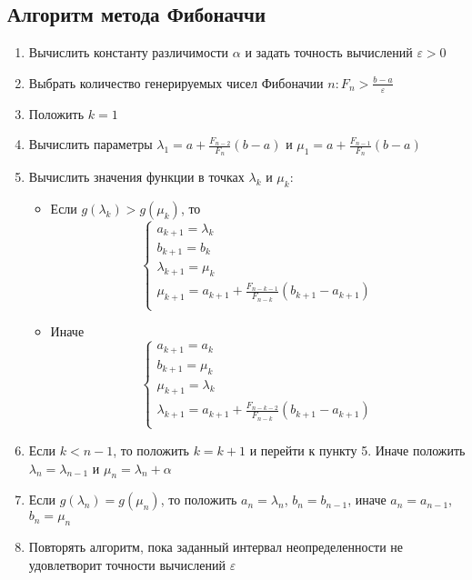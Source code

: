 \documentclass[../body.tex]{subfiles}
\begin{document}
\subsection{Алгоритм метода Фибоначчи}
\begin{enumerate}
	\item Вычислить константу различимости $\alpha$ и задать точность вычислений $\varepsilon>0$
	\item Выбрать количество генерируемых чисел Фибоначии $n:F_n >\frac{b-a}{\varepsilon}$
	\item Положить $k=1$
	\item Вычислить параметры $\lambda_1=a+\frac{F_{n-2}}{F_n}(b-a)$ и $\mu_1=a+\frac{F_{n-1}}{F_n}(b-a)$
	\item Вычислить значения функции в точках $\lambda_k$ и $\mu_k:$
	    \begin{itemize}
	        \item Если $g(\lambda_k)>g(\mu_k)$, то
	            \begin{equation}
	                \left\{
	                \begin{array}{ll}
	                    a_{k+1}=\lambda_k\\
	                    b_{k+1}=b_k\\
	                    \lambda_{k+1}=\mu_k\\
	                    \mu_{k+1} = a_{k+1}+\frac{F_{n-k-1}}{F_{n-k}}(b_{k+1}-a_{k+1})\\
	                \end{array}
	                \right.
	           \end{equation}
	       \item Иначе
	            \begin{equation}
	               \left\{
	               \begin{array}{ll}
	                   a_{k+1}=a_k\\
	                   b_{k+1}=\mu_k\\
	                   \mu_{k+1}=\lambda_k\\ \lambda_{k+1}=a_{k+1}+\frac{F_{n-k-2}}{F_{n-k}}(b_{k+1}-a_{k+1})\\
	               \end{array}
	               \right.
	           \end{equation}
        \end{itemize}
	\item Если $k<n-1$, то положить $k=k+1$ и перейти к пункту 5. Иначе положить $\lambda_{n}=\lambda_{n-1}$ и $\mu_{n}=\lambda_n+\alpha$
	\item Если $g(\lambda_n)=g(\mu_n)$, то положить $a_n=\lambda_n$, $b_n=b_{n-1}$, иначе $a_n=a_{n-1}$, $b_n=\mu_n$
	\item Повторять алгоритм, пока заданный интервал неопределенности не удовлетворит точности вычислений $\varepsilon$
\end{enumerate}
\end{document}
